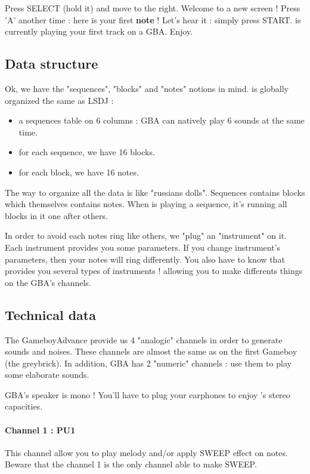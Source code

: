 Press SELECT (hold it) and move to the right. Welcome to a new screen !
Press 'A' another time : here is your first {\bf note} !
Let's hear it : simply press START. \FAT is currently playing your first track on a GBA. Enjoy.


\subsection{Data structure}

Ok, we have the "sequences", "blocks" and "notes" notions in mind. \FAT is globally organized the same as LSDJ :
\begin{itemize}
    \item{a sequences table on 6 columns : GBA can natively play 6 sounds at the same time.}
    \item{for each sequence, we have 16 blocks.}
    \item{for each block, we have 16 notes.}
\end{itemize}\medskip

The way to organize all the data is like "russians dolls". Sequences contains blocks which themselves contains notes.
When \FAT is playing a sequence, it's running all blocks in it one after others.

In order to avoid each notes ring like others, we "plug" an "instrument" on it.
Each instrument provides you some parameters.
If you change instrument's parameters, then your notes will ring differently.
You also have to know that \FAT provides you several types of instruments ! allowing you to make differents things on the GBA's channels.

\subsection{Technical data}

The GameboyAdvance provide us 4 "analogic" channels in order to generate sounds and noises.
These channels are almost the same as on the first Gameboy (the greybrick).
In addition, GBA has 2 "numeric" channels : use them to play some elaborate sounds.

GBA's speaker is mono ! You'll have to plug your earphones to enjoy \FAT's stereo capacities.

\paragraph{Channel 1 : PU1} This channel allow you to play melody and/or apply SWEEP effect on notes. Beware that the channel 1 is the only channel able to make SWEEP.


